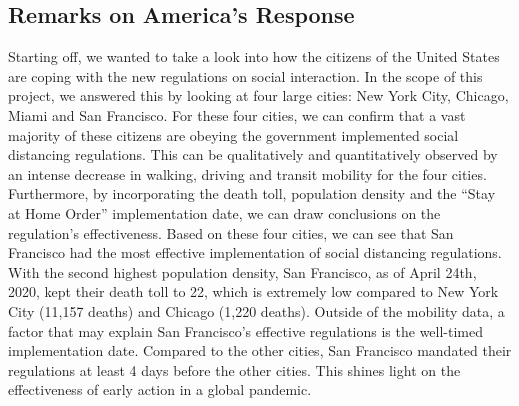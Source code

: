 \documentclass[11pt, english]{article}
\begin{document}
\subsection{Remarks on America's Response}
Starting off, we wanted to take a look into how the citizens of the United States are coping with the new regulations on social interaction. In the scope of this project, we answered this by looking at four large cities: New York City, Chicago, Miami and San Francisco. For these four cities, we can confirm that a vast majority of these citizens are obeying the government implemented social distancing regulations. This can be qualitatively and quantitatively observed by an intense decrease in walking, driving and transit mobility for the four cities. Furthermore, by incorporating the death toll, population density and the “Stay at Home Order” implementation date, we can draw conclusions on the regulation’s effectiveness. Based on these four cities, we can see that San Francisco had the most effective implementation of social distancing regulations. With the second highest population density, San Francisco, as of April 24th, 2020, kept their death toll to 22, which is extremely low compared to New York City (11,157 deaths) and Chicago (1,220 deaths). Outside of the mobility data, a factor that may explain San Francisco’s effective regulations is the well-timed implementation date. Compared to the other cities, San Francisco mandated their regulations at least 4 days before the other cities. This shines light on the effectiveness of early action in a global pandemic. 
\clearpage
\end{document}
